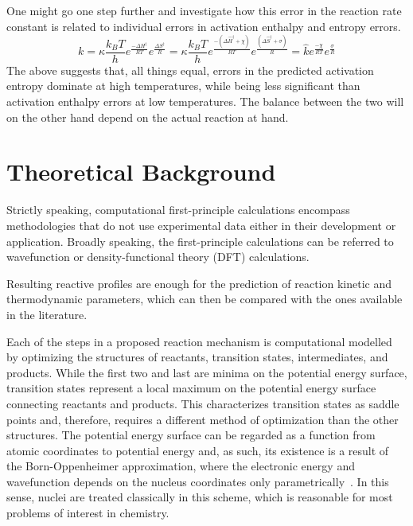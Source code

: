 One might go one step further and investigate how this error in the reaction rate constant
is related to individual errors in activation enthalpy and entropy errors.
%
\begin{equation}
	k = \kappa \frac{k_B T}{h} e^\frac{- \Delta H^\ddagger}{R T}
	e^\frac{  \Delta S^\ddagger}{R}
	= \kappa \frac{k_B T}{h} e^\frac{- \left(\Delta \widehat{H}^\ddagger + \chi\right)}{R T}
	e^\frac{        \left(\Delta \widehat{S}^\ddagger + \sigma\right)}{R}
	= \widehat{k}
	e^\frac{- \chi}{R T}
	e^\frac{  \sigma}{R}
\end{equation}
%
The above suggests that,
all things equal,
errors in the predicted activation entropy dominate at high temperatures,
while being less significant
than activation enthalpy errors at low temperatures.
The balance between the two will on the other hand depend on the actual reaction at hand.

\section{Theoretical Background}%
\label{sec:background-methods}

Strictly speaking,
computational first-principle calculations encompass
methodologies that do not use experimental data either in their development or
application.
Broadly speaking,
the first-principle calculations can be referred to
wavefunction or density-functional theory (DFT) calculations.

Resulting reactive profiles are enough for the prediction of reaction kinetic and thermodynamic parameters,
which can then be compared with the ones available in the literature.

Each of the steps in a proposed reaction mechanism is computational modelled
by optimizing the structures of reactants,
transition states,
intermediates,
and products.
While the first two and last are minima on the potential energy surface,
transition
states represent a local maximum on the potential energy surface connecting
reactants and products.
This characterizes transition states as saddle points and,
therefore,
requires
a different method of optimization than the other structures.
The potential energy surface can be regarded as a function from atomic coordinates to potential energy and,
as such,
its existence is a result of the Born-Oppenheimer approximation,
where the electronic energy and wavefunction depends on the nucleus coordinates
only parametrically~\cite{Born_1927}.
In this sense,
nuclei are treated classically in this scheme,
which is reasonable for most problems of interest in chemistry.

